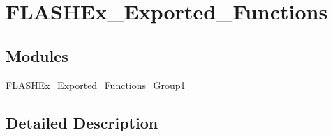 \hypertarget{group___f_l_a_s_h_ex___exported___functions}{}\section{F\+L\+A\+S\+H\+Ex\+\_\+\+Exported\+\_\+\+Functions}
\label{group___f_l_a_s_h_ex___exported___functions}
\subsection*{Modules}
\begin{DoxyCompactItemize}
\item 
\mbox{\hyperlink{group___f_l_a_s_h_ex___exported___functions___group1}{F\+L\+A\+S\+H\+Ex\+\_\+\+Exported\+\_\+\+Functions\+\_\+\+Group1}}
\end{DoxyCompactItemize}


\subsection{Detailed Description}
